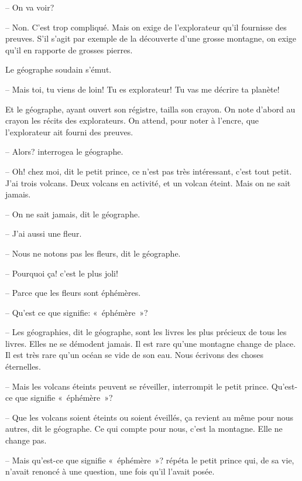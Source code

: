\documentclass[a4paper]{report}
\begin{document}
-- On va voir?

-- Non. C'est trop compliqué. Mais on exige de l'explorateur qu'il fournisse des preuves. S'il s'agit par exemple de la découverte d'une grosse montagne, on exige qu'il en rapporte de grosses pierres.

Le géographe soudain s'émut.

-- Mais toi, tu viens de loin! Tu es explorateur! Tu vas me décrire ta planète!

Et le géographe, ayant ouvert son régistre, tailla son crayon. On note d'abord au crayon les récits des explorateurs. On attend, pour noter à l'encre, que l'explorateur ait fourni des preuves.

-- Alors? interrogea le géographe.

-- Oh! chez moi, dit le petit prince, ce n'est pas très intéressant, c'est tout petit. J'ai trois volcans. Deux volcans en activité, et un volcan éteint. Mais on ne sait jamais.

-- On ne sait jamais, dit le géographe.

-- J'ai aussi une fleur.

-- Nous ne notons pas les fleurs, dit le géographe.

-- Pourquoi ça! c'est le plus joli!


-- Parce que les fleurs sont éphémères.

-- Qu'est ce que signifie: «~éphémère~»?

-- Les géographies, dit le géographe, sont les livres les plus précieux de tous les livres. Elles ne se démodent jamais. Il est rare qu'une montagne change de place. Il est très rare qu'un océan se vide de son eau. Nous écrivons des choses éternelles.

-- Mais les volcans éteints peuvent se réveiller, interrompit le petit prince. Qu'est-ce que signifie «~éphémère~»?

-- Que les volcans soient éteints ou soient éveillés, ça revient au même pour nous autres, dit le géographe. Ce qui compte pour nous, c'est la montagne. Elle ne change pas.

-- Mais qu'est-ce que signifie «~éphémère~»? répéta le petit prince qui, de sa vie, n'avait renoncé à une question, une fois qu'il l'avait posée.
\end{document}
